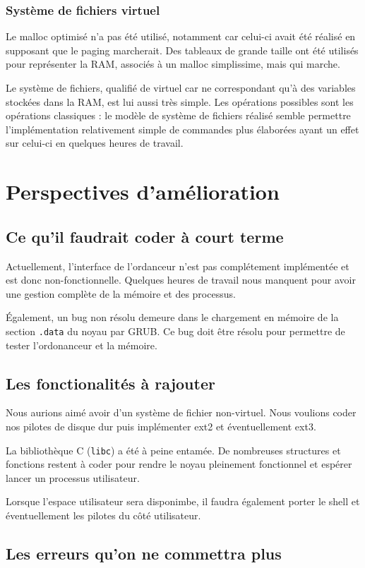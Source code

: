 \documentclass[a4paper, 11pt, twoside]{article}
\begin{document}
\subsubsection{Système de fichiers virtuel}

Le malloc optimisé n'a pas été utilisé, notamment car celui-ci avait été réalisé en supposant
que le paging marcherait. Des tableaux de grande taille ont été utilisés pour représenter
la RAM, associés à un malloc simplissime, mais qui marche.

Le système de fichiers, qualifié de virtuel car ne correspondant qu'à des variables stockées
dans la RAM, est lui aussi très simple.
Les opérations possibles sont les opérations classiques : le modèle de système de fichiers
réalisé semble permettre l'implémentation relativement simple de commandes plus élaborées ayant
un effet sur celui-ci en quelques heures de travail.

\section{Perspectives d'amélioration}

\subsection{Ce qu'il faudrait coder à court terme}

Actuellement, l'interface de l'ordanceur n'est pas complétement implémentée et
est donc non-fonctionnelle. Quelques heures de travail nous manquent pour avoir
une gestion complète de la mémoire et des processus.

Également, un bug non résolu demeure dans le chargement en mémoire de la section
\texttt{.data} du noyau par GRUB. Ce bug doit être résolu pour permettre de
tester l'ordonanceur et la mémoire.

\subsection{Les fonctionalités à rajouter}

Nous aurions aimé avoir d'un système de fichier non-virtuel. Nous voulions coder
nos pilotes de disque dur puis implémenter ext2 et éventuellement ext3.

La bibliothèque C (\texttt{libc}) a été à peine entamée. De nombreuses
structures et fonctions restent à coder pour rendre le noyau pleinement
fonctionnel et espérer lancer un processus utilisateur.

Lorsque l'espace utilisateur sera disponimbe, il faudra également porter le
shell et éventuellement les pilotes du côté utilisateur.

\subsection{Les erreurs qu'on ne commettra plus}
\end{document}
